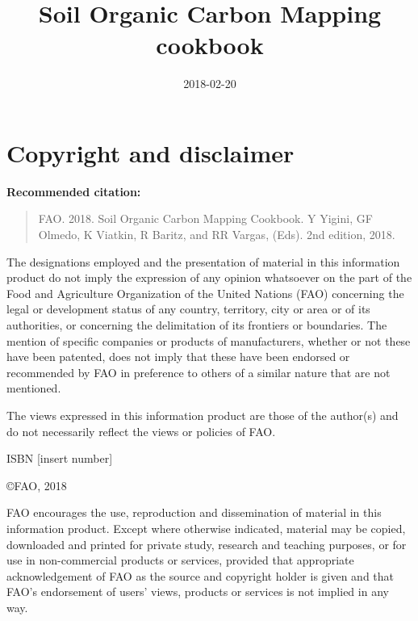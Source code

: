 \documentclass[10pt,b5paper,]{book}
\title{Soil Organic Carbon Mapping cookbook}
\author{}
\date{2018-02-20}
\theoremstyle{definition}
\theoremstyle{definition}
\theoremstyle{definition}
\theoremstyle{remark}
\begin{document}
\maketitle



\frontmatter
{}

\hypertarget{copyright-and-disclaimer}{%
\chapter*{Copyright and disclaimer}\label{copyright-and-disclaimer}}

\textbf{Recommended citation:}

\begin{quote}
FAO. 2018. Soil Organic Carbon Mapping Cookbook. Y Yigini, GF Olmedo, K
Viatkin, R Baritz, and RR Vargas, (Eds). 2nd edition, 2018.
\end{quote}

The designations employed and the presentation of material in this
information product do not imply the expression of any opinion
whatsoever on the part of the Food and Agriculture Organization of the
United Nations (FAO) concerning the legal or development status of any
country, territory, city or area or of its authorities, or concerning
the delimitation of its frontiers or boundaries. The mention of specific
companies or products of manufacturers, whether or not these have been
patented, does not imply that these have been endorsed or recommended by
FAO in preference to others of a similar nature that are not mentioned.

The views expressed in this information product are those of the
author(s) and do not necessarily reflect the views or policies of FAO.

ISBN {[}insert number{]}

\copyright FAO, 2018

FAO encourages the use, reproduction and dissemination of material in
this information product. Except where otherwise indicated, material may
be copied, downloaded and printed for private study, research and
teaching purposes, or for use in non-commercial products or services,
provided that appropriate acknowledgement of FAO as the source and
copyright holder is given and that FAO's endorsement of users' views,
products or services is not implied in any way.
\end{document}
